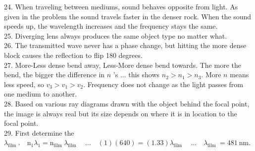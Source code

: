 \begin{enumerate}
24. When traveling between mediums, sound behaves opposite from light. As given in the problem the sound travels faster in the denser rock. When the sound speeds up, the wavelength increases and the frequency stays the same.\\
25. Diverging lens always produces the same object type no matter what.\\
26. The transmitted wave never has a phase change, but hitting the more dense block causes the reflection to flip 180 degrees.\\
27. More-Less dense bend away, Less-More dense bend towards. The more the bend, the bigger the difference in $n$ 's ... this shows $n_{2}>n_{1}>n_{3}$. More $n$ means less speed, so $v_{3}>v_{1}>v_{2}$. Frequency does not change as the light passes from one medium to another.\\
28. Based on various ray diagrams drawn with the object behind the focal point, the image is always real but its size depends on where it is in location to the focal point.\\
29. First determine the $\lambda_{\text {film }} . \quad \mathrm{n}_{1} \lambda_{1}=\mathrm{n}_{\text {film }} \lambda_{\text {film }} \quad \ldots \quad(1)(640)=(1.33) \lambda_{\text {film }} \quad \ldots \quad \lambda_{\text {film }}=481 \mathrm{~nm}$.


\end{enumerate}

